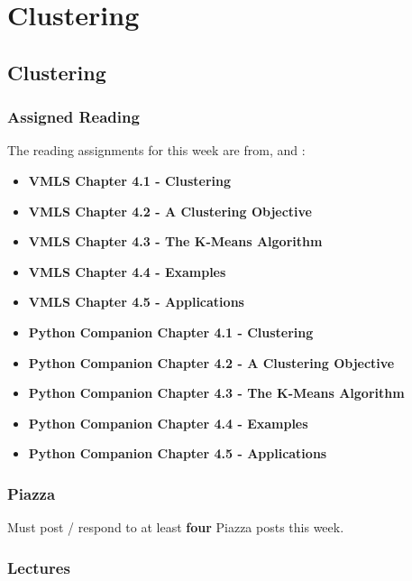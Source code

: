 \clearpage

\renewcommand{\ChapTitle}{Clustering}
\renewcommand{\SectionTitle}{Clustering}

\chapter{\ChapTitle}
\section{\SectionTitle}

\subsection{Assigned Reading}

The reading assignments for this week are from, \VMLS \hspace*{1pt} and \PyCap:

\begin{itemize}
    \item \textbf{VMLS Chapter 4.1 - Clustering}
    \item \textbf{VMLS Chapter 4.2 - A Clustering Objective}
    \item \textbf{VMLS Chapter 4.3 - The K-Means Algorithm}
    \item \textbf{VMLS Chapter 4.4 - Examples}
    \item \textbf{VMLS Chapter 4.5 - Applications}
    \item \textbf{Python Companion Chapter 4.1 - Clustering}
    \item \textbf{Python Companion Chapter 4.2 - A Clustering Objective}
    \item \textbf{Python Companion Chapter 4.3 - The K-Means Algorithm}
    \item \textbf{Python Companion Chapter 4.4 - Examples}
    \item \textbf{Python Companion Chapter 4.5 - Applications}
\end{itemize}

\subsection{Piazza}

Must post / respond to at least \textbf{four} Piazza posts this week.

\subsection{Lectures}

